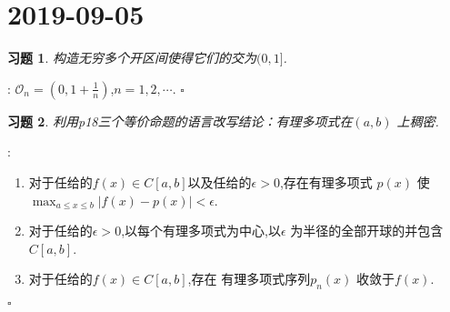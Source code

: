 \documentclass[a4paper]{article}
\newtheorem*{exe}{习题}
\newenvironment{sol}{{\noindent\bfseries 解}:}{\hfill $\square$\par}
\begin{document}
\section{2019-09-05}
\begin{exe}
  构造无穷多个开区间使得它们的交为$(0,1]$.
\end{exe}
\begin{sol}
  $\mathcal{O}_n=\left( 0,1+\frac{1}{n} \right) $,$n=1,2,\cdots.$
\end{sol}
\begin{exe}
  利用p18三个等价命题的语言改写结论：有理多项式在$(a,b)$ 上稠密.
\end{exe}
\begin{sol}
  \begin{enumerate}
    \item 对于任给的$f(x)\in C[a,b]$以及任给的$\epsilon >0$,存在有理多项式 $p(x)$ 使$\max_{a\le x\le b}\left| f(x)-p(x) \right|<\epsilon  $.
    \item 对于任给的$\epsilon >0$,以每个有理多项式为中心,以$\epsilon $ 为半径的全部开球的并包含$C[a,b]$.
    \item 对于任给的$f(x)\in C[a,b]$,存在 有理多项式序列$p_n(x)$ 收敛于$f(x)$.
  \end{enumerate}
\end{sol}
\end{document}
